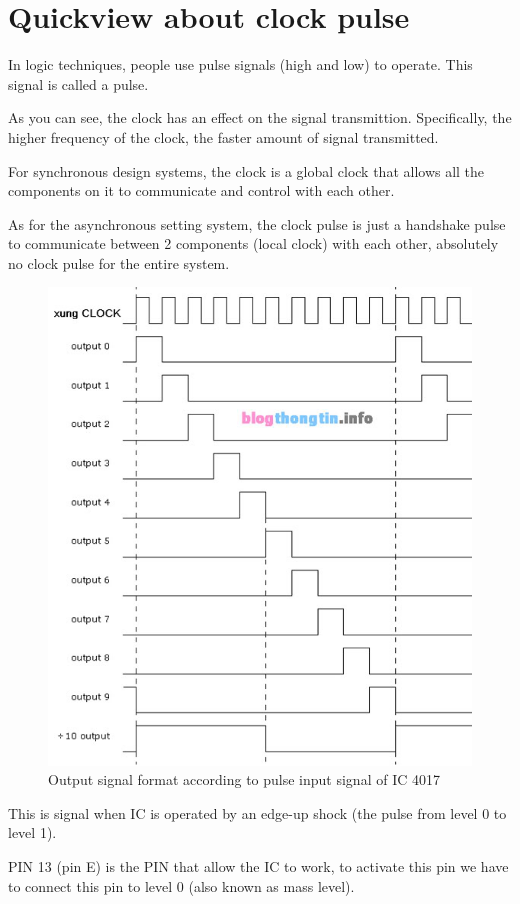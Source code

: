 \documentclass[a4paper]{report}
\begin{document}
    \section{Quickview about clock pulse}
        In logic techniques, people use pulse signals (high and low) to operate. This signal is called a pulse. 
        \linebreak
        \par As you can see, the clock has an effect on the signal transmittion. Specifically, the higher 
        frequency of the clock, the faster amount of signal transmitted. 
        \linebreak
        \par For synchronous design systems, the clock is a global clock that allows all the components 
        on it to communicate and control with each other. 
        \linebreak
        \par As for the asynchronous setting system, the clock pulse is just a handshake pulse to 
        communicate between 2 components (local clock) with each other, absolutely no clock pulse for 
        the entire system. 
        \newpage
        \begin{figure}[ht]
            \centering
            \includegraphics[width=0.5\linewidth]{n2.jpg}
            \caption{\label{fig:boat2}Output signal format according to pulse input signal of IC 4017}
        \end{figure}
        \par This is signal when IC is operated by an edge-up shock (the pulse from level 0 to level 1). 
        \linebreak
        \par PIN 13 (pin E) is the PIN that allow the IC to work, to activate this pin we have to connect 
        this pin to level 0 (also known as mass level).
\end{document}
